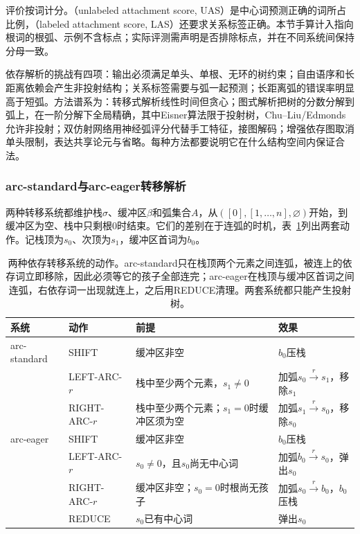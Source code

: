 评价按词计分。（unlabeled attachment score, UAS）是中心词预测正确的词所占比例，（labeled attachment score, LAS）还要求关系标签正确。本节手算计入指向根词的根弧、示例不含标点；实际评测需声明是否排除标点，并在不同系统间保持分母一致。

依存解析的挑战有四项：输出必须满足单头、单根、无环的树约束；自由语序和长距离依赖会产生非投射结构；关系标签需要与弧一起预测；长距离弧的错误率明显高于短弧。方法谱系为：转移式解析线性时间但贪心；图式解析把树的分数分解到弧上，在一阶分解下全局精确，其中Eisner算法限于投射树，Chu--Liu/Edmonds允许非投射；双仿射网络用神经弧评分代替手工特征，接图解码；增强依存图取消单头限制，表达共享论元与省略。每种方法都要说明它在什么结构空间内保证合法。

\subsubsection{arc-standard与arc-eager转移解析}
\label{sec:nlp-analysis-arc-transition}

两种转移系统都维护栈$\sigma$、缓冲区$\beta$和弧集合$A$，从$([0],[1,\ldots,n],\varnothing)$开始，到缓冲区为空、栈中只剩根0时结束。它们的差别在于连弧的时机，表~\ref{tab:nlp-analysis-arc-systems}列出两套动作。记栈顶为$s_0$、次顶为$s_1$，缓冲区首词为$b_0$。

\begin{table}[htbp]
  \centering
  \begin{tabularx}{\linewidth}{@{}l l X X@{}}
    \toprule
    系统&动作&前提&效果\\
    \midrule
    arc-standard&SHIFT&缓冲区非空&$b_0$压栈\\
    &LEFT-ARC-$r$&栈中至少两个元素，$s_1\neq0$&加弧$s_0\xrightarrow{r}s_1$，移除$s_1$\\
    &RIGHT-ARC-$r$&栈中至少两个元素；$s_1=0$时缓冲区须为空&加弧$s_1\xrightarrow{r}s_0$，移除$s_0$\\
    \midrule
    arc-eager&SHIFT&缓冲区非空&$b_0$压栈\\
    &LEFT-ARC-$r$&$s_0\neq0$，且$s_0$尚无中心词&加弧$b_0\xrightarrow{r}s_0$，弹出$s_0$\\
    &RIGHT-ARC-$r$&缓冲区非空；$s_0=0$时根尚无孩子&加弧$s_0\xrightarrow{r}b_0$，$b_0$压栈\\
    &REDUCE&$s_0$已有中心词&弹出$s_0$\\
    \bottomrule
  \end{tabularx}
  \caption{两种依存转移系统的动作。arc-standard只在栈顶两个元素之间连弧，被连上的依存词立即移除，因此必须等它的孩子全部连完；arc-eager在栈顶与缓冲区首词之间连弧，右依存词一出现就连上，之后用REDUCE清理。两套系统都只能产生投射树。}
  \label{tab:nlp-analysis-arc-systems}
\end{table}

